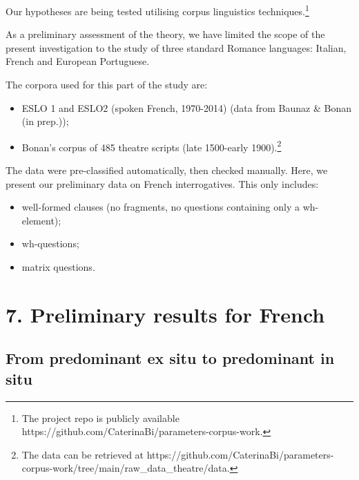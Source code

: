 \documentclass[fleqn,10pt]{wlscirep}
\begin{document}
Our hypotheses are being tested utilising corpus linguistics techniques.\footnote{The project repo is publicly available https://github.com/CaterinaBi/parameters-corpus-work.}
 
As a preliminary assessment of the theory, we have limited the scope of the present investigation to the study of three standard Romance languages: Italian, French and European Portuguese. 

\noindent The corpora used for this part of the study are: 

\begin{itemize}
\item[\ding{227}] \vspace*{-2mm} ESLO 1 and ESLO2 (spoken French, 1970-2014) (data from Baunaz \& Bonan (in prep.));
\item[\ding{227}] \vspace*{-2mm} Bonan's corpus of 485 theatre scripts (late 1500-early 1900).\footnote{The data can be retrieved at https://github.com/CaterinaBi/parameters-corpus-work/tree/main/raw_data_theatre/data.}
\end{itemize}

\noindent The data were pre-classified automatically, then checked manually.
\noindent Here, we present our preliminary data on French interrogatives. This only includes:
\begin{itemize}
    \item[\ding{227}] \vspace*{-2mm} well-formed clauses (no fragments, no questions containing only a wh-element);
    \item[\ding{227}] \vspace*{-2mm} wh-questions;
    \item[\ding{227}] \vspace*{-2mm} matrix questions.
\end{itemize}

\section*{7. Preliminary results for French}

\subsection*{From predominant ex situ to predominant in situ}
\end{document}
